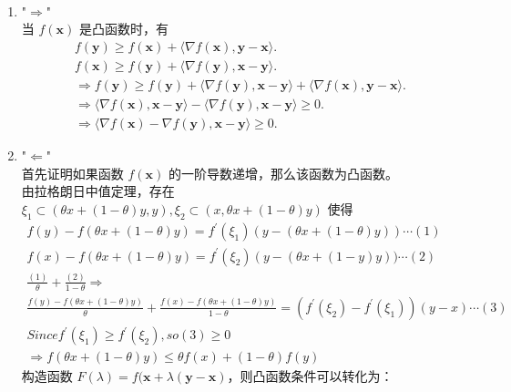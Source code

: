 \documentclass[11pt,letter,notitlepage]{article}
\begin{document}
\begin{solution}
	\heiti
	\ \\
	\begin{enumerate}
		\item "$\Rightarrow$"\\
			当 $f(\mathbf{x})$ 是凸函数时，有 
			\begin{align*}
				f(\mathbf{y}) \geq f(\mathbf{x}) + \langle \nabla f(\mathbf{x}) , \mathbf{y} - \mathbf{x} \rangle.\\
				f(\mathbf{x}) \geq f(\mathbf{y}) + \langle \nabla f(\mathbf{y}) , \mathbf{x} - \mathbf{y} \rangle.\\
				\Rightarrow f(\mathbf{y}) \geq f(\mathbf{y}) + \langle \nabla f(\mathbf{y}) , \mathbf{x} - \mathbf{y} \rangle + \langle \nabla f(\mathbf{x}) , \mathbf{y} - \mathbf{x} \rangle.\\
				\Rightarrow \langle \nabla f(\mathbf{x}) , \mathbf{x} - \mathbf{y} \rangle - \langle \nabla f(\mathbf{y}) , \mathbf{x} - \mathbf{y} \rangle \geq 0.\\
				\Rightarrow \langle \nabla f(\mathbf{x}) - \nabla f(\mathbf{y}) , \mathbf{x} - \mathbf{y} \rangle \geq 0.
			\end{align*}
		\item "$\Leftarrow$"\\
		首先证明如果函数 $f(\mathbf{x})$ 的一阶导数递增，那么该函数为凸函数。\\
		由拉格朗日中值定理，存在$\xi_1 \subset (\theta x+(1-\theta) y, y), \xi_2 \subset (x, \theta x+(1-\theta) y)$ 使得
		$$
		\begin{array}{l}{f(y)-f(\theta x+(1-\theta) y)=f^{\prime}\left(\xi_{1}\right)(y-(\theta x+(1-\theta) y)) \cdots (1)} \\ {f(x)-f(\theta x+(1-\theta) y)=f^{\prime}\left(\xi_{2}\right)\left(y-(\theta x+(1-y) y)) \cdots (2)\right.} \\ {\frac{(1)}{\theta}+\frac{(2)}{1-\theta} \Rightarrow} \\ {\frac{f(y)-f(\theta x+(1-\theta) y)}{\theta}+\frac{f(x)-f(\theta x+(1-\theta) y)}{1-\theta}=\left(f^{\prime}\left(\xi_{2}\right)-f^{\prime}\left(\xi_{1}\right)\right)(y - x) \cdots (3)} \\Since {f^{\prime}\left(\xi_{1}\right) \geqslant f^{\prime}\left(\xi_{2}\right)}, so (3) \geq 0 \\ {\Rightarrow f(\theta x+(1-\theta) y) \leqslant \theta f(x)+(1-\theta) f(y)}\end{array}
		$$
		构造函数 $  F(\lambda) = f(\mathbf{x} + \lambda(\mathbf{y}-\mathbf{x})$，则凸函数条件可以转化为：

\end{enumerate}
\end{solution}
\end{document}
